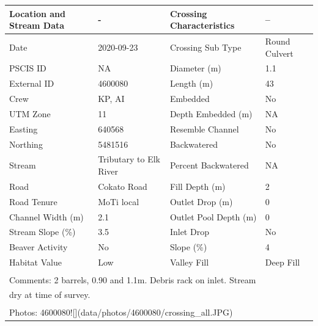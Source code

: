 \documentclass[
]{book}
\begin{document}
\begin{tabular}{l|l|l|l}
\hline
Location and Stream Data & - & Crossing Characteristics & --\\
\hline
Date & 2020-09-23 & Crossing Sub Type & Round Culvert\\
\hline
PSCIS ID & NA & Diameter (m) & 1.1\\
\hline
External ID & 4600080 & Length (m) & 43\\
\hline
Crew & KP, AI & Embedded & No\\
\hline
UTM Zone & 11 & Depth Embedded (m) & NA\\
\hline
Easting & 640568 & Resemble Channel & No\\
\hline
Northing & 5481516 & Backwatered & No\\
\hline
Stream & Tributary to Elk River & Percent Backwatered & NA\\
\hline
Road & Cokato Road & Fill Depth (m) & 2\\
\hline
Road Tenure & MoTi local & Outlet Drop (m) & 0\\
\hline
Channel Width (m) & 2.1 & Outlet Pool Depth (m) & 0\\
\hline
Stream Slope (\%) & 3.5 & Inlet Drop & No\\
\hline
Beaver Activity & No & Slope (\%) & 4\\
\hline
Habitat Value & Low & Valley Fill & Deep Fill\\
\hline
\multicolumn{4}{l}{\textsuperscript{} Comments: 2 barrels, 0.90 and 1.1m. Debris rack on inlet. Stream}\\
\multicolumn{4}{l}{dry at time of survey.}\\
\multicolumn{4}{l}{\textsuperscript{} Photos: 4600080![](data/photos/4600080/crossing\_all.JPG)}\\
\end{tabular}
\end{document}
